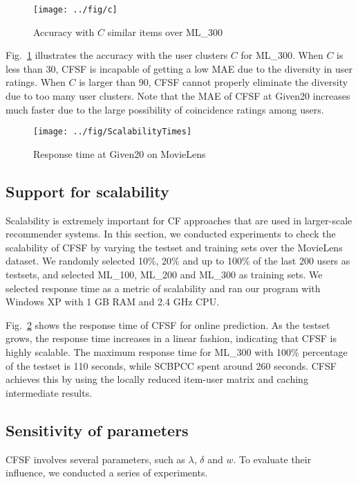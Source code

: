 \begin{figure}[htb]
  \centering
  \texttt{[image: ../fig/c]}\\
  \vspace{-2ex}\caption{Accuracy with $C$ similar items over ML\_300}
  \label{fig:c}
\end{figure}

Fig.~\ref{fig:c} illustrates the accuracy with the user clusters $C$ for ML\_300. When $C$ is less than 30, CFSF is incapable of getting a low MAE due to the diversity in user ratings. When $C$ is larger than 90, CFSF cannot properly eliminate the diversity due to too many user clusters. Note that the MAE of CFSF at Given20 increases much faster due to the large possibility of coincidence ratings among users.

\begin{figure}[htb]
  \centering
  \texttt{[image: ../fig/ScalabilityTimes]}
  \vspace{-2ex}\caption{Response time at Given20 on MovieLens}
  \label{fig:scaMovieLens}
\end{figure}

\subsection{Support for scalability}
Scalability is extremely important for CF approaches that are used in larger-scale recommender systems. In this section, we conducted experiments to check the scalability of CFSF by varying the testset and training sets over the MovieLens dataset. We randomly selected 10\%, 20\% and up to 100\% of the last 200 users as testsets, and selected ML\_100, ML\_200 and ML\_300 as training sets. We selected response time as a metric of scalability and ran our program with Windows XP with 1 GB RAM and 2.4 GHz CPU.

Fig.~\ref{fig:scaMovieLens} shows the response time of CFSF for online prediction. As the testset grows, the response time increases in a linear fashion, indicating that CFSF is highly scalable. The maximum response time for ML\_300 with 100\% percentage of the testset is 110 seconds, while SCBPCC spent around 260 seconds. CFSF achieves this by using the locally reduced item-user matrix and caching intermediate results.



\subsection{Sensitivity of parameters}
CFSF involves several parameters, such as $\lambda$, $\delta$ and $w$. To evaluate their influence, we conducted a series of experiments.

